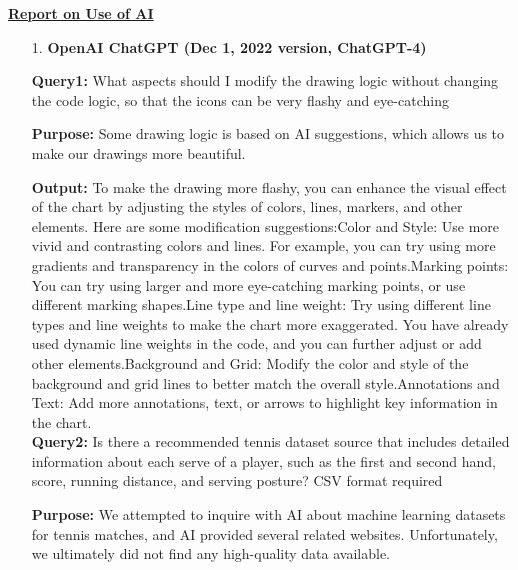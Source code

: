 \documentclass[12pt]{article}  %
\begin{document}
\begin{subappendices}
\begin{lstlisting}[language=Python, name={LightGBM.py}]
\end{lstlisting}


\clearpage
\begin{letter}{\centering \underline{\textbf{Report on Use of AI}}}
	
	\begin{itemize}
		\setlength{\parsep}{0ex} %
		\setlength{\topsep}{2ex} %
		\setlength{\itemsep}{1ex} %
		\item[1.]  \textbf{OpenAI ChatGPT (Dec 1, 2022 version, ChatGPT-4)}
		
		
		
		\subitem\textbf{Query1: }What aspects should I modify the drawing logic without changing the code logic, so that the icons can be very flashy and eye-catching
		
		\subitem\textbf{Purpose: }Some drawing logic is based on AI suggestions, which allows us to make our drawings more beautiful.
		
		\subitem\textbf{Output: }To make the drawing more flashy, you can enhance the visual effect of the chart by adjusting the styles of colors, lines, markers, and other elements. Here are some modification suggestions:Color and Style: Use more vivid and contrasting colors and lines. For example, you can try using more gradients and transparency in the colors of curves and points.Marking points: You can try using larger and more eye-catching marking points, or use different marking shapes.Line type and line weight: Try using different line types and line weights to make the chart more exaggerated. You have already used dynamic line weights in the code, and you can further adjust or add other elements.Background and Grid: Modify the color and style of the background and grid lines to better match the overall style.Annotations and Text: Add more annotations, text, or arrows to highlight key information in the chart.\\
		
		\subitem\textbf{Query2: }Is there a recommended tennis dataset source that includes detailed information about each serve of a player, such as the first and second hand, score, running distance, and serving posture? CSV format required
		
		\subitem\textbf{Purpose: }We attempted to inquire with AI about machine learning datasets for tennis matches, and AI provided several related websites. Unfortunately, we ultimately did not find any high-quality data available.
		

\end{itemize}
\end{letter}
\end{subappendices}
\end{document}
